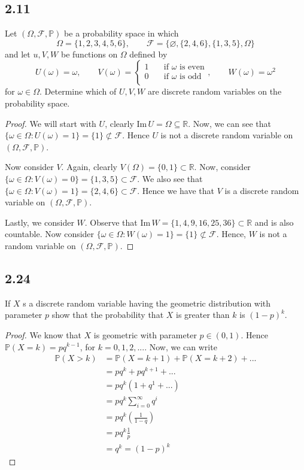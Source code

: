 \documentclass{article}
\newcommand{\R}{\mathbb{R}}
\newcommand{\F}{\mathcal{F}}
\renewcommand{\P}{\mathbb{P}}
\newcommand{\probspace}{(\Omega, \mathcal{F}, \mathbb{P})}
\newcommand{\Image}[1]{\text{Im}\, #1}
\begin{document}
    \subsection*{2.11}
    Let $\probspace$ be a probability space in which
    $$\Omega = \{1,2,3,4,5,6\}, \qquad \F = \{\varnothing, \{2,4,6\}, \{1,3,5\}, \Omega\}$$
    and let $u, V, W$ be functions on $\Omega$ defined by
    $$U(\omega)= \omega, \qquad V(\omega) = \begin{cases}
        1 \quad &\text{if $\omega$ is even} \\
        0 \quad &\text{if $\omega$ is odd} \\
    \end{cases}, \qquad
    W(\omega)= \omega ^2$$
    for $\omega \in \Omega$. Determine which of $U, V, W$ are discrete random variables
    on the probability space.
    \begin{proof}
        We will start with $U$, clearly $\Image{U} = \Omega \subseteq \R$.
        Now, we can see that $\{\omega \in \Omega: U(\omega) = 1\} = \{1\} \not \subset \F$.
        Hence $U$ is not a discrete random variable on $\probspace$.

        Now consider $V$. Again, clearly $V(\Omega) = \{0,1\} \subset \R$.
        Now, consider $\{\omega \in \Omega: V(\omega)=0\} = \{1,3,5\} \subset \F$. We
        also see that $\{\omega \in \Omega: V(\omega)=1\} = \{2,4,6\} \subset \F$. Hence
        we have that $V$ is a discrete random variable on $\probspace$.

        Lastly, we consider $W$. Observe that $\Image{W} = \{1,4,9,16,25,36\} \subset \R$
        and is also countable. Now consider 
        $\{\omega \in \Omega: W(\omega) = 1\} = \{1\} \not \subset \F$. Hence, $W$ is not
        a random variable on $\probspace$.
    \end{proof}
    \subsection*{2.24}
    If $X$ s a discrete random variable having the geometric distribution with parameter
    $p$ show that the probability that $X$ is greater than $k$ is $(1-p)^k$.
    \begin{proof}
        We know that $X$ is geometric with parameter $p \in (0,1)$. Hence
        $\P(X=k) = pq^{k-1}$, for $k=0,1,2,...$. Now, we can write
        \begin{align*}
            \P(X > k) &= \P(X = k + 1) + \P(X = k + 2) + ... \\
                &= pq^{k} + pq^{k + 1} + ... \\
                &= pq^k(1+q^1 + ...) \\
                &= pq^k \sum_{i = 0}^{\infty}q^i \\
                &= pq^k \left(\frac{1}{1 - q}\right) \\
                &= pq^k\frac{1}{p} \\
                &= q^k = (1-p)^k
        \end{align*}
    \end{proof}
\end{document}

